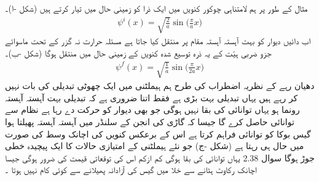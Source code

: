  مثال کے طور پر ہم لامتناہی چوکور کنویں میں ایک ذرا کو زمینی حال میں تیار کرتے ہیں (شکل -ا)۔
\begin{align}
\psi^i (x) = \sqrt{\frac{2}{a}} \sin \big ( \frac{\pi}{a} x \big )
\end{align}
 اب دائیں  دیوار کو بہت آہستہ آہستہ مقام  پر منتقل کیا جاتا ہے مسئلہ حرارت نہ گزر کے تحت ماسوائے جزو ضربی ہیّت کے یہ ذرہ توسیع شدہ کنویں کے زمینی حال میں منتقل ہوگا  (شکل  -ب)۔
\begin{align}
\psi^f (x) = \sqrt{\frac{1}{a}} \sin \big ( \frac{\pi}{2a} x \big )
\end{align}
دھیان رہے کے نظریہ اضطراب کی طرح ہم ہيملٹنی میں ایک چھوٹی تبدیلی کی بات نہیں کر رہے ہیں یہاں تبدیلی بہت بڑی ہے فقط اتنا ضروری ہے کہ تبدیلی بہت آہستہ آہستہ رونما ہو یہاں توانائی کی بقا نہیں ہوگی جو بھی دیوار کو حرکت دے رہا ہے نظام سے توانائی حاصل کرے گا جیسا کہ گاڑی کی انجن کے سلنڈر میں آہستہ آہستہ پھیلتا ہوا گیس بوکا کو توانائی فراہم کرتا ہے اس کے برعکس کنویں کی اچانک وسط کی صورت میں حال  ہی رہتا ہے  (شکل  -ج)  جو نئے ہیملٹنی کے امتیازی حالات کا ایک پیچیدہ خطی جوڑ ہوگا سوال 2.38 یہاں توانائی کی بقا ہوگی کم ازکم اس کی توقعاتی قیمت کی ضرور ہوگی جیسا اچانک رکاوٹ ہٹانے سے خلا میں گیس کی آزادانہ پھیلانے  سے کوئی کام نہیں ہوتا ۔


